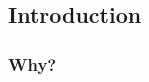 
\subsection{Introduction}
\subsubsection{Why?}
\begin{frame}
    \begin{block}{}
        \begin{center}
            \shadowoffset{2pt}
            \shadowtext{{\fontsize{30}{60}\selectfont \textbf{\textcolor{black}{Jet Energy Corrections}}}}
            \vspace{1.5mm}
        \end{center}
    \end{block}
\end{frame}

